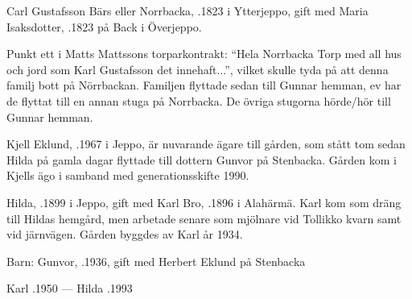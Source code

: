 Carl Gustafsson Bärs eller Norrbacka, .1823 i Ytterjeppo, gift med Maria Isaksdotter, .1823 på Back i Överjeppo.
\begin{jhchildren}
  \item {}
  \item {}
  \item {}
  \item {}
  \item {}
  \item {}
\end{jhchildren}

Punkt ett i Matts Mattssons torparkontrakt: ``Hela Norrbacka Torp med all hus och jord som Karl Gustafsson det innehaft...'', vilket skulle tyda på att denna familj bott på Nörrbackan. Familjen flyttade sedan till Gunnar hemman, ev har de flyttat till en annan stuga på Norrbacka. De övriga stugorna hörde/hör till Gunnar hemman.






Kjell Eklund, .1967 i Jeppo, är nuvarande ägare till gården, som stått tom sedan Hilda på gamla dagar flyttade till dottern Gunvor på Stenbacka. Gården kom i Kjells ägo i samband med generationsskifte 1990.\jhvspace{}


Hilda, .1899 i Jeppo, gift med Karl Bro, .1896 i Alahärmä. Karl kom som dräng till Hildas hemgård, men arbetade senare som mjölnare vid Tollikko kvarn samt vid järnvägen. Gården byggdes av Karl år 1934.

Barn: Gunvor, .1936, gift med Herbert Eklund på Stenbacka

Karl .1950  ---  Hilda .1993






